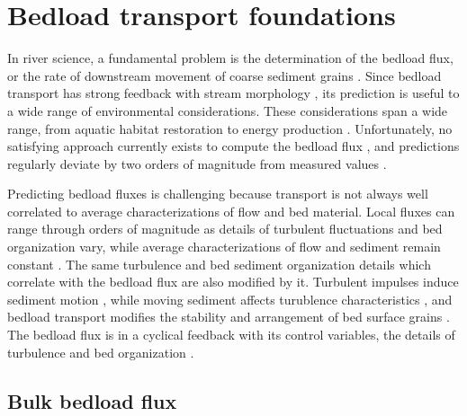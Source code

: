 \section{Bedload transport foundations}

In river science, a fundamental problem is the determination of the bedload flux, or the rate of downstream movement of coarse sediment grains \citep{Ballio2014}.
Since bedload transport has strong feedback with stream morphology \citep{Church2006, Recking2016}, its prediction is useful to a wide range of environmental considerations. 
These considerations span a wide range, from aquatic habitat restoration to energy production \citep{Kondolf2014, Wohl2015a}. 
Unfortunately, no satisfying approach currently exists to compute the bedload flux \citep{Ancey2020,Ancey2020a}, and predictions regularly deviate by two orders of magnitude from measured values \citep{Gomez1989, Barry2004, Bathurst2007a, Recking2012}. 

Predicting bedload fluxes is challenging because transport is not always well correlated to average characterizations of flow and bed material. 
Local fluxes can range through orders of magnitude as details of turbulent fluctuations and bed organization vary, while average characterizations of flow and sediment remain constant \citep{Sumer2003, Charru2004, Hassan2008, Venditti2017}.
The same turbulence and bed sediment organization details which correlate with the bedload flux are also modified by it.
Turbulent impulses induce sediment motion \citep{Valyrakis2010, Celik2014, Amir2014, Shih2017}, while moving sediment affects turublence characteristics \citep{Singh2010, Santos2014, Liu2016}, and bedload transport modifies the stability and arrangement of bed surface grains \citep{Kirchener1990, Charru2004, Hassan2008}.
The bedload flux is in a cyclical feedback with its control variables, the details of turbulence and bed organization \citep{Jerolmack2005}. 

\subsection{Bulk bedload flux}


